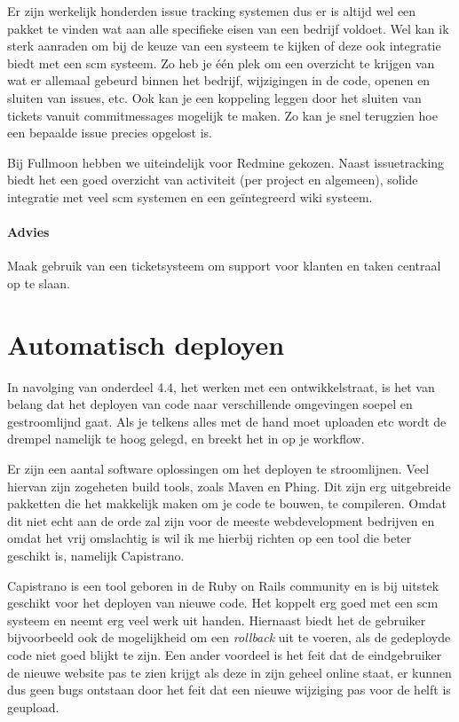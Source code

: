 Er zijn werkelijk honderden issue tracking systemen\cite{issuetracking} dus er is altijd wel een pakket te vinden wat aan alle specifieke eisen van een bedrijf voldoet. Wel kan ik sterk aanraden om bij de keuze van een systeem te kijken of deze ook integratie biedt met een {\sc scm} systeem. Zo heb je één plek om een overzicht te krijgen van wat er allemaal gebeurd binnen het bedrijf, wijzigingen in de code, openen en sluiten van issues, etc. Ook kan je een koppeling leggen door het sluiten van tickets vanuit commitmessages mogelijk te maken. Zo kan je snel terugzien hoe een bepaalde issue precies opgelost is.

Bij Fullmoon hebben we uiteindelijk voor Redmine\cite{redmine} gekozen. Naast issuetracking biedt het een goed overzicht van activiteit (per project en algemeen), solide integratie met veel {\sc scm} systemen en een geïntegreerd wiki systeem.

\paragraph{Advies} Maak gebruik van een ticketsysteem om support voor klanten en taken centraal op te slaan. 

\section{Automatisch deployen}

In navolging van onderdeel 4.4, het werken met een ontwikkelstraat, is het van belang dat het deployen van code naar verschillende omgevingen soepel en gestroomlijnd gaat. Als je telkens alles met de hand moet uploaden etc wordt de drempel namelijk te hoog gelegd, en breekt het in op je workflow.

Er zijn een aantal software oplossingen om het deployen te stroomlijnen. Veel hiervan zijn zogeheten build tools, zoals Maven\cite{maven} en Phing\cite{phing}. Dit zijn erg uitgebreide pakketten die het makkelijk maken om je code te bouwen, te compileren. Omdat dit niet echt aan de orde zal zijn voor de meeste webdevelopment bedrijven en omdat het vrij omslachtig is wil ik me hierbij richten op een tool die beter geschikt is, namelijk Capistrano\cite{capistrano}.

Capistrano is een tool geboren in de Ruby on Rails community en is bij uitstek geschikt voor het deployen van nieuwe code. Het koppelt erg goed met een {\sc scm} systeem en neemt erg veel werk uit handen. Hiernaast biedt het de gebruiker bijvoorbeeld ook de mogelijkheid om een \emph{rollback} uit te voeren, als de gedeployde code niet goed blijkt te zijn. Een ander voordeel is het feit dat de eindgebruiker de nieuwe website pas te zien krijgt als deze in zijn geheel online staat, er kunnen dus geen bugs ontstaan door het feit dat een nieuwe wijziging pas voor de helft is geupload.

